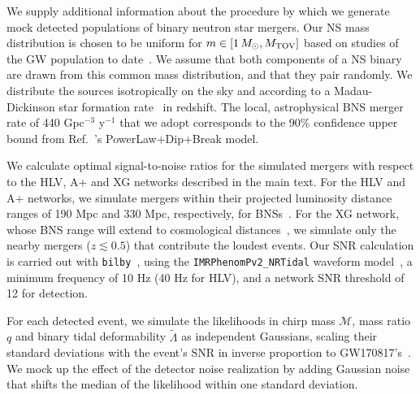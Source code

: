 \documentclass[aps,prl,twocolumn,superscriptaddress,footinbib]{revtex4-1}
\newcommand{\Msun}{\ensuremath{\,M_{\odot}}}
\begin{document}
We supply additional information about the procedure by which we generate mock detected populations of binary neutron star mergers. Our NS mass distribution is chosen to be uniform for $m \in [1\Msun,M_{\rm TOV}]$ based on studies of the GW population to date~\cite{LandryRead2021,LVK_O3bPop}. 
We assume that both components of a NS binary are drawn from this common mass distribution, and that they pair randomly.
We distribute the sources isotropically on the sky and according to a Madau-Dickinson star formation rate~\cite{MadauDickinson2014} in redshift. 
The local, astrophysical BNS merger rate of 440 Gpc$^{-3}$ y$^{-1}$ that we adopt corresponds to the 90\% confidence upper bound from Ref.~\cite{LVK_O3bPop}'s PowerLaw+Dip+Break model.

We calculate optimal signal-to-noise ratios for the simulated mergers with respect to the HLV, A+ and XG networks described in the main text. For the HLV and A+ networks, we simulate mergers within their projected luminosity distance ranges of 190 Mpc and 330 Mpc, respectively, for BNSs~\cite{AbbottAbbott2018_ObservingScenarios}. 
For the XG network, whose BNS range will extend to cosmological distances~\cite{EvansAdhikari2021,BorhanianSathyaprakash2022}, we simulate only the nearby mergers ($z \lesssim 0.5$) that contribute the loudest events. Our SNR calculation is carried out with \texttt{bilby}~\cite{AshtonHubner2019}, using the \texttt{IMRPhenomPv2\_NRTidal} waveform model~\cite{DietrichKhan2019}, a minimum frequency of 10 Hz (40 Hz for HLV), and a network SNR threshold of 12 for detection.

For each detected event, we simulate the likelihoods in chirp mass $\mathcal{M}$, mass ratio $q$ and binary tidal deformability $\tilde{\Lambda}$ as independent Gaussians, scaling their standard deviations with the event's SNR in inverse proportion to GW170817's~\cite{FarrBerry2016}. We mock up the effect of the detector noise realization by adding Gaussian noise that shifts the median of the likelihood within one standard deviation.
\end{document}
